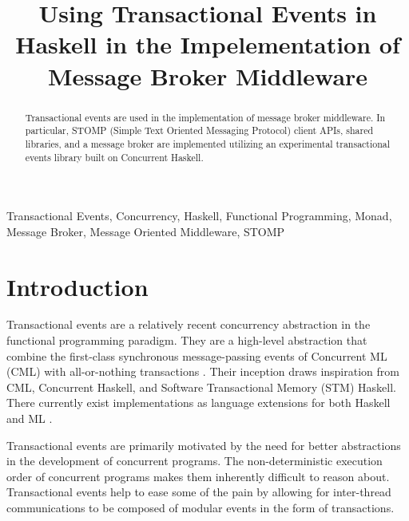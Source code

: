 \documentclass[conference, letterpaper]{IEEEtran}
\begin{document}
\title{Using Transactional Events in Haskell in the Impelementation of Message Broker Middleware}

\author{
}

\maketitle

\begin{abstract}
Transactional events are used in the  implementation of message broker middleware. In particular, STOMP 
(Simple Text Oriented Messaging Protocol) client APIs, shared libraries, and a message broker are implemented 
utilizing an experimental transactional events library built on Concurrent Haskell.
\end{abstract}

\begin{IEEEkeywords}
Transactional Events, Concurrency, Haskell, Functional Programming, Monad, Message Broker, 
Message Oriented Middleware, STOMP
\end{IEEEkeywords}

\IEEEpeerreviewmaketitle

\section{Introduction}
Transactional events are a relatively recent concurrency abstraction in the functional programming
paradigm. They are a high-level abstraction that combine the first-class synchronous message-passing events
of Concurrent ML (CML) with all-or-nothing transactions \cite{te:original}. Their inception draws
inspiration from CML, Concurrent Haskell, and Software Transactional Memory (STM) Haskell. There currently 
exist implementations as language extensions for both Haskell \cite{te:original} and ML \cite{te:ml}.

Transactional events are primarily motivated by the need for better abstractions in the development of 
concurrent programs. The non-deterministic execution order of concurrent programs makes them inherently
difficult to reason about. Transactional events help to ease some of the pain by allowing for inter-thread
communications to be composed of modular events in the form of transactions.
\end{document}
